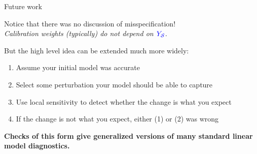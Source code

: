 \begin{frame}{Future work}

Notice that there was no discussion of misspecification!\\[1em]

\emph{Calibration weights (typically) do not depend on $\textcolor{blue}{Y_{\mathcal{S}}}$.}

\pause

\vspace{2em}
But the high level idea can be extended much more widely:
%
\begin{enumerate}
\item Assume your initial model was accurate
\item Select some perturbation your model should be able to capture
\item Use local sensitivity to detect whether the change is what you expect
\item If the change is not what you expect, either (1) or (2) was wrong
\end{enumerate}
%

\pause

\vspace{2em}
\textbf{
Checks of this form give generalized versions of many standard linear model diagnostics.
}
\end{frame}




\def\res{\varepsilon}
\def\w{w}
\def\eqcheck{\overset{\textrm{check}}{=}}
\def\wtil{\tilde{\w}}
\def\reshat{\hat{\res}}

\def\methodrow#1#2#3{
\begin{minipage}[t]{0.15\textwidth}
    \centering
    #1
\end{minipage}
\hfill
\begin{minipage}[t]{0.4\textwidth}
    \centering
    \vspace{-2em}
    #2
    \pause
\end{minipage}
\hfill
\begin{minipage}[t]{0.4\textwidth}
    \centering
    \vspace{-2em}
    #3
    \pause
\end{minipage}
}


\def\methodspacer{
    \vspace{1em}
    \hrule
    \vspace{1em}
}


